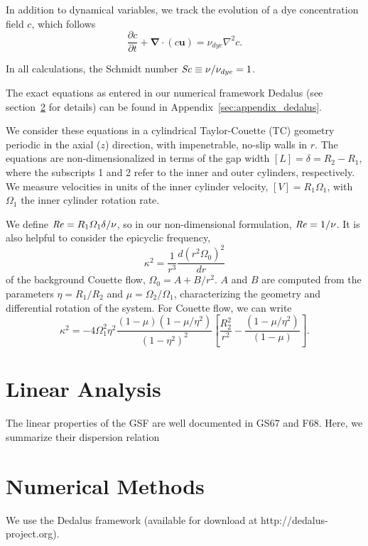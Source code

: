 \documentclass{jfm}
\begin{document}
In addition to dynamical variables, we track the evolution of a dye concentration field $c$, which follows 
\begin{equation}
  \label{eq:dye}
  \frac{\partial c}{\partial t} + \mathbf{\nabla \cdot} (c \mathbf{u}) = \nu_{dye} \nabla^2 c.
\end{equation}

In all calculations, the Schmidt number $\mbox{\textit{Sc}} \equiv \nu/\nu_{dye} = 1$.

The exact equations as entered in our numerical framework Dedalus (see
section~\ref{sec:numerical} for details) can be found in
Appendix~\ref{sec:appendix_dedalus}.

We consider these equations in a cylindrical Taylor-Couette (TC) geometry
periodic in the axial ($z$) direction, with impenetrable, no-slip
walls in $r$. The equations are non-dimensionalized in terms of the
gap width $[L] = \delta = R_2 -R_1$, where the subscripts 1 and 2
refer to the inner and outer cylinders, respectively. We measure
velocities in units of the inner cylinder velocity,
$[V] = R_1 \Omega_1$, with $\Omega_1$ the inner cylinder rotation
rate. 

We define $\mbox{\textit{Re}} = R_1 \varOmega_1 \delta/\nu$, so in our non-dimensional
formulation, $\mbox{\textit{Re}} = 1/\nu$. It is also helpful to consider the epicyclic frequency, 
\begin{equation}
  \label{eq:epicyclic_freq}
\kappa^2 = \frac{1}{r^3}\frac{d (r^2 \Omega_0)^2}{dr}
\end{equation}
of the background Couette flow, $\Omega_0 = A + B/r^2$. $A$ and $B$
are computed from the parameters $\eta = R_1/R_2$ and
$\mu = \Omega_2/\Omega_1$, characterizing the geometry and
differential rotation of the system. For Couette flow, we can write 
\begin{equation}
  \label{eq:kappa_couette}
  \kappa^2 = - 4 \Omega_1^2 \eta^2
  \frac{(1-\mu)(1-\mu/\eta^2)}{(1-\eta^2)^2}
  \left[\frac{R_2^2}{r^2} -\frac{(1-\mu/\eta^2)}{(1-\mu)} \right].
\end{equation}

\section{Linear Analysis}
\label{sec:linear}
The linear properties of the GSF are well documented in GS67 and
F68. Here, we summarize their dispersion relation 

\section{Numerical Methods}
\label{sec:numerical}
We use the Dedalus framework (available for download at
http://dedalus-project.org). 
\end{document}
